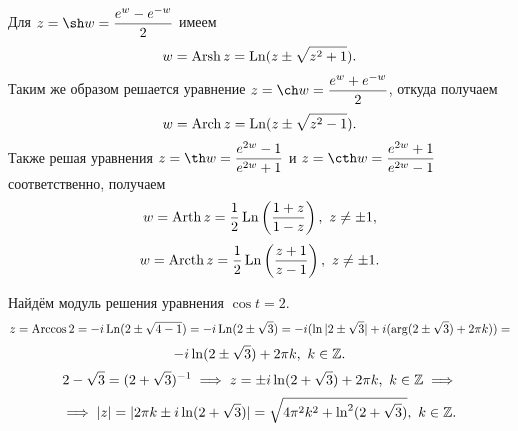\documentclass[../../main.tex]{subfiles}
\begin{document}
Для $ z = \sh w = \dfrac{e^{w} - e^{-w}}{2} $ имеем
\begin{equation}
\label{lec27:29}
w = \operatorname{Arsh} z = \operatorname{Ln}(z \pm \sqrt{z^2 + 1}).
\end{equation}
Таким же образом решается уравнение $ z = \ch w = \dfrac{e^{w} + 
e^{-w}}{2} $, откуда получаем 
\begin{equation}
\label{lec27:30}
w = \operatorname{Arch} z = \operatorname{Ln}(z \pm \sqrt{z^2 - 1}).
\end{equation}
Также решая уравнения $ z = \th 
w = \dfrac{e^{2w} - 1}{e^{2w} + 1} $ и 
$ z = \cth w = \dfrac{e^{2w} + 1}{e^{2w} - 1} $ соответственно,
получаем
\begin{equation}
\label{lec27:31}
w = \operatorname{Arth} z = \dfrac{1}{2} \operatorname{Ln} \left(\dfrac{1 + z}{1 - z}\right),\ z \neq \pm 1,
\end{equation}
\begin{equation}
\label{lec27:32}
w = \operatorname{Arcth} z = \dfrac{1}{2} \operatorname{Ln} \left(\dfrac{z + 1}{z - 1}\right),\
z \neq \pm 1.
\end{equation}
\begin{exmp}
	Найдём модуль решения уравнения $ \cos t = 2 $.
	\[
	z = \operatorname{Arccos} 2 = -i\operatorname{Ln}(2 \pm \sqrt{4 - 1}) = 
	-i \operatorname{Ln}(2 \pm \sqrt{3}) = -i (\ln|2 \pm \sqrt{3}| + i(\arg(2 \pm \sqrt{3}) + 
	2\pi k)) = \]\[
	-i \ln(2 \pm \sqrt{3}) + 2\pi k,\ k \in \mathbb{Z}.
	\]
	\[
	2 - \sqrt{3} = (2 + \sqrt{3})^{-1} \implies
	z = \pm i \ln (2 + \sqrt{3}) + 2\pi k,\ k \in \mathbb{Z} \implies \] \[\implies
	|z| = |2\pi k \pm i\ln(2 + \sqrt{3})| = 
	\sqrt{4\pi^2 k^2 + \ln^2(2 + \sqrt{3})},\ k \in \mathbb{Z}.
	\]
\end{exmp}
\end{document}
